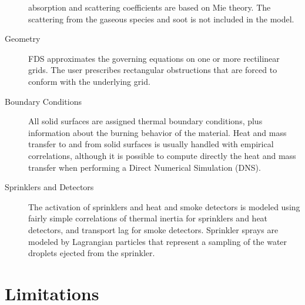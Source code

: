 \documentclass[11pt]{book}
\begin{document}
\begin{description}
absorption and scattering coefficients are based on Mie theory. The scattering from the gaseous species and soot is not included in the model.
\item[Geometry]
FDS approximates the governing equations on one or more rectilinear grids. The user prescribes rectangular obstructions that are forced to conform
with the underlying grid.
\item[Boundary Conditions]
All solid surfaces are assigned thermal boundary conditions, plus information about the burning behavior of the material. Heat and mass transfer to
and from solid surfaces is usually handled with empirical correlations, although it is possible to compute directly the heat and mass transfer when
performing a Direct Numerical Simulation (DNS).
\item[Sprinklers and Detectors] The activation of sprinklers and heat and smoke detectors
is modeled using fairly simple correlations of thermal inertia for sprinklers and heat detectors, and transport lag for smoke detectors. Sprinkler
sprays are modeled by Lagrangian particles that represent a sampling of the water droplets ejected from the sprinkler.
\end{description}


\section{Limitations}
\end{document}
